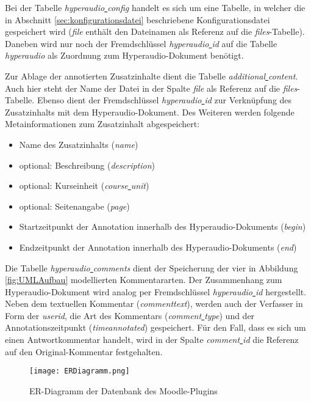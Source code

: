 Bei der Tabelle \textit{hyperaudio\underline{{ }}config} handelt es sich um eine Tabelle, in welcher die in Abschnitt \ref{sec:konfigurationsdatei} beschriebene Konfigurationsdatei gespeichert wird (\textit{file} enthält den Dateinamen als Referenz auf die \textit{files}-Tabelle). Daneben wird nur noch der Fremdschlüssel \textit{hyperaudio\underline{{ }}id} auf die Tabelle \textit{hyperaudio} als Zuordnung zum Hyperaudio-Dokument benötigt.

Zur Ablage der annotierten Zusatzinhalte dient die Tabelle \textit{additional\underline{{ }}content}. Auch hier steht der Name der Datei in der Spalte \textit{file} als Referenz auf die \textit{files}-Tabelle. Ebenso dient der Fremdschlüssel \textit{hyperaudio\underline{{ }}id} zur Verknüpfung des Zusatzinhalts mit dem Hyperaudio-Dokument. Des Weiteren werden folgende Metainformationen zum Zusatzinhalt abgespeichert:

\begin{itemize}

\item Name des Zusatzinhalts (\textit{name})
\item optional: Beschreibung (\textit{description})
\item optional: Kurseinheit (\textit{course\underline{{ }}unit})
\item optional: Seitenangabe (\textit{page})
\item Startzeitpunkt der Annotation innerhalb des Hyperaudio-Dokuments (\textit{begin})
\item Endzeitpunkt der Annotation innerhalb des Hyperaudio-Dokuments (\textit{end})

\end{itemize}

Die Tabelle \textit{hyperaudio\underline{{ }}comments} dient der Speicherung der vier in Abbildung \ref{fig:UMLAufbau} modellierten Kommentararten. Der Zusammenhang zum Hyperaudio-Dokument wird analog per Fremdschlüssel \textit{hyperaudio\underline{{ }}id} hergestellt. Neben dem textuellen Kommentar (\textit{commenttext}), werden auch der Verfasser in Form der \textit{userid}, die Art des Kommentars (\textit{comment\underline{{ }}type}) und der Annotationszeitpunkt (\textit{timeannotated}) gespeichert. Für den Fall, dass es sich um einen Antwortkommentar handelt, wird in der Spalte \textit{comment\underline{{ }}id} die Referenz auf den Original-Kommentar festgehalten.

\begin{figure}[h!]
\texttt{[image: ERDiagramm.png]}
\caption{\label{fig:ERDiagramm}ER-Diagramm der Datenbank des Moodle-Plugins}
\end{figure}


